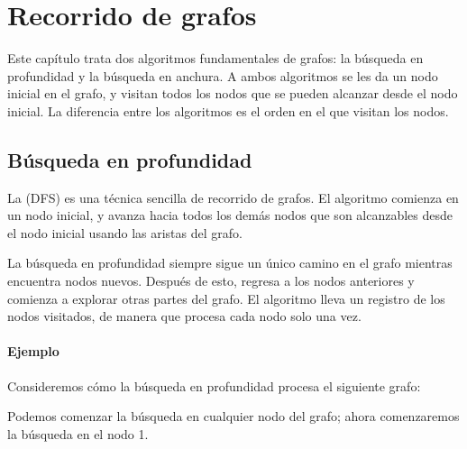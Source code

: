 \chapter{Recorrido de grafos}

Este capítulo trata dos algoritmos
fundamentales de grafos:
la búsqueda en profundidad y la búsqueda en anchura.
A ambos algoritmos se les da un nodo
inicial en el grafo,
y visitan todos los nodos que se pueden alcanzar
desde el nodo inicial.
La diferencia entre los algoritmos es el orden
en el que visitan los nodos.

\section{Búsqueda en profundidad}


La  (DFS)
es una técnica sencilla de recorrido de grafos.
El algoritmo comienza en un nodo inicial,
y avanza hacia todos los demás nodos que son
alcanzables desde el nodo inicial usando
las aristas del grafo.

La búsqueda en profundidad siempre sigue un único
camino en el grafo mientras encuentra
nodos nuevos.
Después de esto, regresa a los nodos
anteriores y comienza a explorar otras partes del grafo.
El algoritmo lleva un registro de los nodos visitados,
de manera que procesa cada nodo solo una vez.

\subsubsection*{Ejemplo}

Consideremos cómo la búsqueda en profundidad procesa
el siguiente grafo:
\begin{center}
\end{center}
Podemos comenzar la búsqueda en cualquier nodo del grafo;
ahora comenzaremos la búsqueda en el nodo 1.

